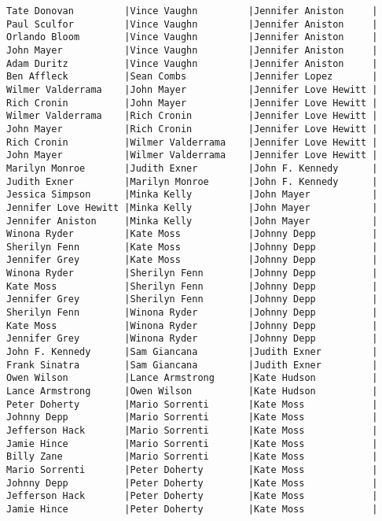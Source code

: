 \documentclass{article}
\begin{document}
\begin{verbatim}
Tate Donovan         |Vince Vaughn         |Jennifer Aniston     |
Paul Sculfor         |Vince Vaughn         |Jennifer Aniston     |
Orlando Bloom        |Vince Vaughn         |Jennifer Aniston     |
John Mayer           |Vince Vaughn         |Jennifer Aniston     |
Adam Duritz          |Vince Vaughn         |Jennifer Aniston     |
Ben Affleck          |Sean Combs           |Jennifer Lopez       |
Wilmer Valderrama    |John Mayer           |Jennifer Love Hewitt |
Rich Cronin          |John Mayer           |Jennifer Love Hewitt |
Wilmer Valderrama    |Rich Cronin          |Jennifer Love Hewitt |
John Mayer           |Rich Cronin          |Jennifer Love Hewitt |
Rich Cronin          |Wilmer Valderrama    |Jennifer Love Hewitt |
John Mayer           |Wilmer Valderrama    |Jennifer Love Hewitt |
Marilyn Monroe       |Judith Exner         |John F. Kennedy      |
Judith Exner         |Marilyn Monroe       |John F. Kennedy      |
Jessica Simpson      |Minka Kelly          |John Mayer           |
Jennifer Love Hewitt |Minka Kelly          |John Mayer           |
Jennifer Aniston     |Minka Kelly          |John Mayer           |
Winona Ryder         |Kate Moss            |Johnny Depp          |
Sherilyn Fenn        |Kate Moss            |Johnny Depp          |
Jennifer Grey        |Kate Moss            |Johnny Depp          |
Winona Ryder         |Sherilyn Fenn        |Johnny Depp          |
Kate Moss            |Sherilyn Fenn        |Johnny Depp          |
Jennifer Grey        |Sherilyn Fenn        |Johnny Depp          |
Sherilyn Fenn        |Winona Ryder         |Johnny Depp          |
Kate Moss            |Winona Ryder         |Johnny Depp          |
Jennifer Grey        |Winona Ryder         |Johnny Depp          |
John F. Kennedy      |Sam Giancana         |Judith Exner         |
Frank Sinatra        |Sam Giancana         |Judith Exner         |
Owen Wilson          |Lance Armstrong      |Kate Hudson          |
Lance Armstrong      |Owen Wilson          |Kate Hudson          |
Peter Doherty        |Mario Sorrenti       |Kate Moss            |
Johnny Depp          |Mario Sorrenti       |Kate Moss            |
Jefferson Hack       |Mario Sorrenti       |Kate Moss            |
Jamie Hince          |Mario Sorrenti       |Kate Moss            |
Billy Zane           |Mario Sorrenti       |Kate Moss            |
Mario Sorrenti       |Peter Doherty        |Kate Moss            |
Johnny Depp          |Peter Doherty        |Kate Moss            |
Jefferson Hack       |Peter Doherty        |Kate Moss            |
Jamie Hince          |Peter Doherty        |Kate Moss            |

\end{verbatim}
\end{document}
